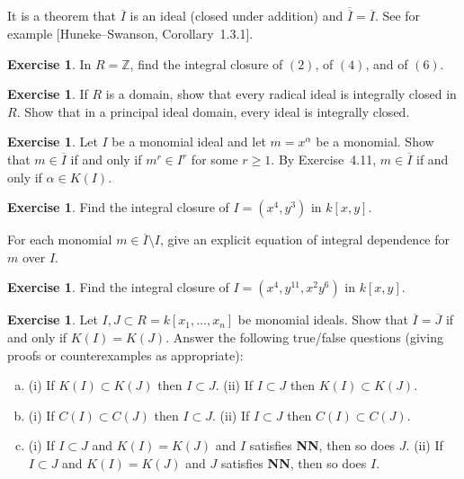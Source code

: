 \documentclass{amsart}
\theoremstyle{plain}
\theoremstyle{definition}
\newtheorem{exercise}[theorem]{Exercise}
\theoremstyle{definition}
\newcommand{\Z}{\mathbb{Z}}
\begin{document}
It is a theorem that $\overline{I}$ is an ideal (closed under addition)
and $\overline{\overline{I}} = \overline{I}$.
See for example [Huneke--Swanson, Corollary~1.3.1].


\begin{exercise}
In $R = \Z$, find the integral closure of $(2)$, of $(4)$, and of $(6)$.
\end{exercise}

\begin{exercise} %
If $R$ is a domain, show that every radical ideal
is integrally closed in $R$.
Show that in a principal ideal domain, every ideal is integrally closed.
\end{exercise}





\begin{exercise}
Let $I$ be a monomial ideal and let $m = x^{\alpha}$ be a monomial.
Show that $m \in \overline{I}$ if and only if $m^r \in I^r$ for some $r \geq 1$.
By Exercise~4.11, $m \in \overline{I}$ if and only if $\alpha \in K(I)$.
\end{exercise}


\begin{exercise}  Find the integral closure of $I = (x^4, y^3)$ in $k[x,y]$.

For each monomial $m \in \overline{I} \setminus I$, give an explicit equation
of integral dependence for $m$ over $I$.
\end{exercise}

\begin{exercise} Find the integral closure of $I = (x^4, y^{11}, x^2y^6)$ in $k[x,y]$.
\end{exercise}


\begin{exercise}
Let $I, J \subset R = k[x_1,\dots,x_n]$ be monomial ideals.
Show that $\overline{I} = \overline{J}$ if and only if $K(I) = K(J)$.
Answer the following true/false questions (giving proofs or counterexamples as appropriate):
\begin{enumerate}[a.]
\item (i) If $K(I) \subset K(J)$ then $I \subset J$. (ii) If $I \subset J$ then $K(I) \subset K(J)$.
\item (i) If $C(I) \subset C(J)$ then $I \subset J$. (ii) If $I \subset J$ then $C(I) \subset C(J)$.
\item (i) If $I \subset J$ and $K(I) = K(J)$ and $I$ satisfies \textbf{NN}, then so does $J$.
(ii) If $I \subset J$ and $K(I) = K(J)$ and $J$ satisfies \textbf{NN}, then so does $I$.
\end{enumerate}
\end{exercise}
\end{document}

